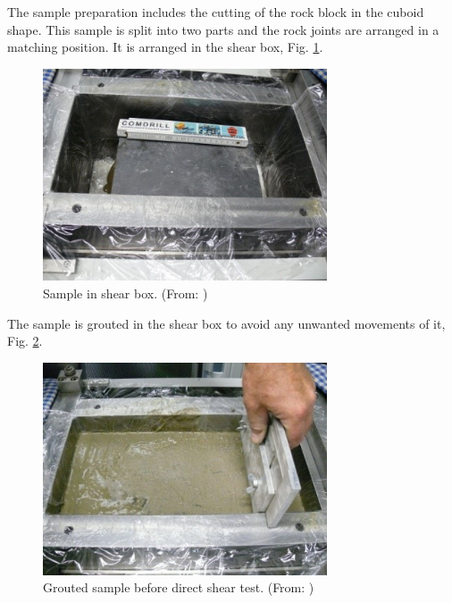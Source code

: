 The sample preparation includes the cutting of the rock block in the cuboid shape. This sample is split into two parts and the rock joints are arranged in a matching position. It is arranged in the shear box, Fig. \ref{fig:ExpCNLSampleInShearBox}.

\begin{figure}[!ht]
\begin{center}
\includegraphics[width=0.75\textwidth]{./figures/ExpCNLSampleInShearBox.jpg}
\end{center}
\caption{Sample in shear box. (From: \cite{Nguyen2014})}
\label{fig:ExpCNLSampleInShearBox}
\end{figure}

The sample is grouted in the shear box to avoid any unwanted movements of it, Fig. \ref{fig:ExpCNLGroutedSample}.

\begin{figure}[!ht]
\begin{center}
\includegraphics[width=0.75\textwidth]{./figures/ExpCNLGroutedSample.jpg}
\end{center}
\caption{Grouted sample before direct shear test. (From: \cite{Nguyen2014})}
\label{fig:ExpCNLGroutedSample}
\end{figure}

